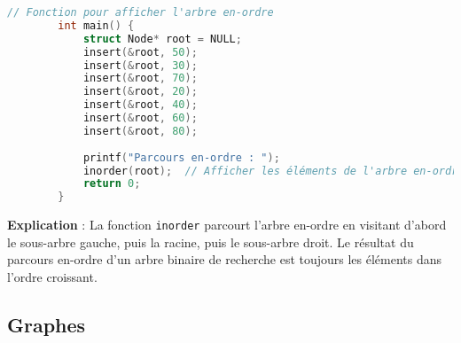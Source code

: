 \begin{enumerate}
\begin{lstlisting}[language=C]
		// Fonction pour afficher l'arbre en-ordre
		int main() {
			struct Node* root = NULL;
			insert(&root, 50);
			insert(&root, 30);
			insert(&root, 70);
			insert(&root, 20);
			insert(&root, 40);
			insert(&root, 60);
			insert(&root, 80);
			
			printf("Parcours en-ordre : ");
			inorder(root);  // Afficher les éléments de l'arbre en-ordre
			return 0;
		}
	\end{lstlisting}
	
	\textbf{Explication} :
	La fonction \texttt{inorder} parcourt l'arbre en-ordre en visitant d'abord le sous-arbre gauche, puis la racine, puis le sous-arbre droit. Le résultat du parcours en-ordre d'un arbre binaire de recherche est toujours les éléments dans l'ordre croissant.
	
\end{enumerate}



\subsection{Graphes}

